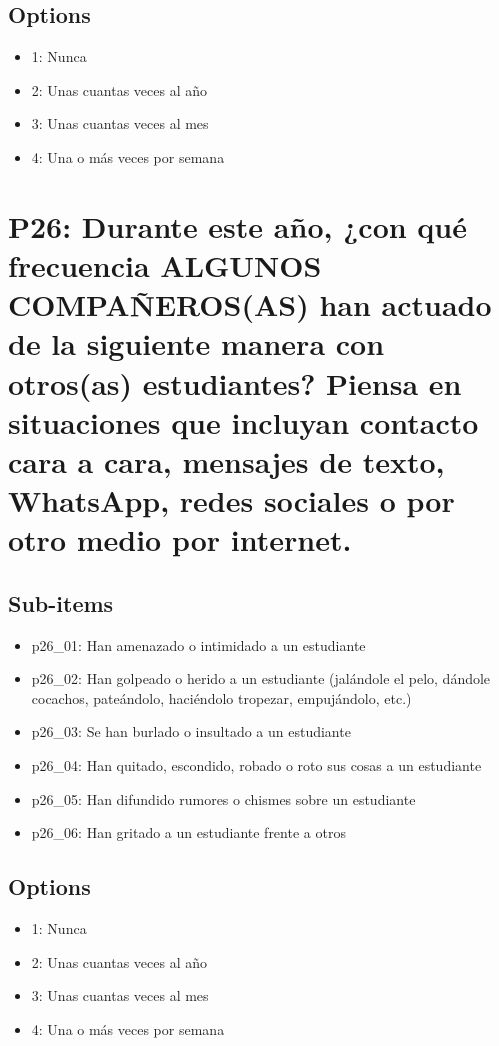 \documentclass[11pt]{article}
\begin{document}
\subsection*{Options}
\begin{itemize}[leftmargin=*]
  \item 1: Nunca
  \item 2: Unas cuantas veces al año
  \item 3: Unas cuantas veces al mes
  \item 4: Una o más veces por semana
\end{itemize}
\bigskip
\section*{P26: Durante este año, ¿con qué frecuencia ALGUNOS COMPAÑEROS(AS) han actuado de la siguiente manera con otros(as) estudiantes? Piensa en situaciones que incluyan contacto cara a cara, mensajes de texto, WhatsApp, redes sociales o por otro medio por internet.}
\subsection*{Sub-items}
\begin{itemize}[leftmargin=*]
  \item p26\_01: Han amenazado o intimidado a un estudiante
  \item p26\_02: Han golpeado o herido a un estudiante (jalándole el pelo, dándole cocachos, pateándolo, haciéndolo tropezar, empujándolo, etc.)
  \item p26\_03: Se han burlado o insultado a un estudiante
  \item p26\_04: Han quitado, escondido, robado o roto sus cosas a un estudiante
  \item p26\_05: Han difundido rumores o chismes sobre un estudiante
  \item p26\_06: Han gritado a un estudiante frente a otros
\end{itemize}
\subsection*{Options}
\begin{itemize}[leftmargin=*]
  \item 1: Nunca
  \item 2: Unas cuantas veces al año
  \item 3: Unas cuantas veces al mes
  \item 4: Una o más veces por semana
\end{itemize}
\bigskip
\end{document}

